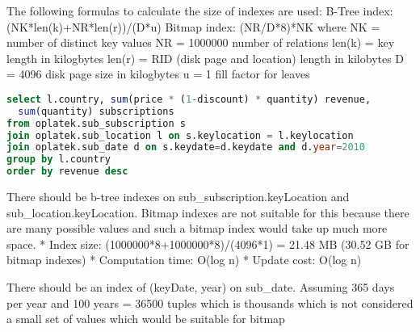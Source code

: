 The following formulas to calculate the size of indexes are used: 
B-Tree index: (NK*len(k)+NR*len(r))/(D*u)
Bitmap index: (NR/D*8)*NK
where
NK = number of distinct key values
NR = 1000000 number of relations
len(k) = key length in kilogbytes
len(r) = RID (disk page and location) length in kilobytes
D = 4096 disk page size in kilogbytes
u = 1 fill factor for leaves

\begin{lstlisting}[language=sql]
select l.country, sum(price * (1-discount) * quantity) revenue, 
  sum(quantity) subscriptions 
from oplatek.sub_subscription s 
join oplatek.sub_location l on s.keylocation = l.keylocation 
join oplatek.sub_date d on s.keydate=d.keydate and d.year=2010
group by l.country 
order by revenue desc
\end{lstlisting}

There should be b-tree indexes on sub_subscription.keyLocation and sub_location.keyLocation. Bitmap indexes are not suitable for this because there are many possible values and such a bitmap index would take up much more space.
* Index size: (1000000*8+1000000*8)/(4096*1) = 21.48 MB (30.52 GB for bitmap indexes)
* Computation time: O(log n)
* Update cost: O(log n)

There should be an index of (keyDate, year) on sub_date. Assuming 365 days per year and 100 years = 36500 tuples which is thousands which is not considered a small set of values which would be suitable for bitmap 